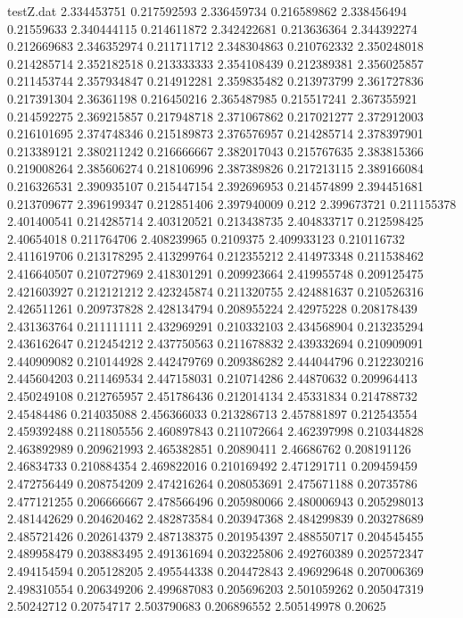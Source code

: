 \begin{filecontents*}{testZ.dat}
2.334453751  0.217592593
2.336459734  0.216589862
2.338456494  0.21559633
2.340444115  0.214611872
2.342422681  0.213636364
2.344392274  0.212669683
2.346352974  0.211711712
2.348304863  0.210762332
2.350248018  0.214285714
2.352182518  0.213333333
2.354108439  0.212389381
2.356025857  0.211453744
2.357934847  0.214912281
2.359835482  0.213973799
2.361727836  0.217391304
2.36361198  0.216450216
2.365487985  0.215517241
2.367355921  0.214592275
2.369215857  0.217948718
2.371067862  0.217021277
2.372912003  0.216101695
2.374748346  0.215189873
2.376576957  0.214285714
2.378397901  0.213389121
2.380211242  0.216666667
2.382017043  0.215767635
2.383815366  0.219008264
2.385606274  0.218106996
2.387389826  0.217213115
2.389166084  0.216326531
2.390935107  0.215447154
2.392696953  0.214574899
2.394451681  0.213709677
2.396199347  0.212851406
2.397940009  0.212
2.399673721  0.211155378
2.401400541  0.214285714
2.403120521  0.213438735
2.404833717  0.212598425
2.40654018  0.211764706
2.408239965  0.2109375
2.409933123  0.210116732
2.411619706  0.213178295
2.413299764  0.212355212
2.414973348  0.211538462
2.416640507  0.210727969
2.418301291  0.209923664
2.419955748  0.209125475
2.421603927  0.212121212
2.423245874  0.211320755
2.424881637  0.210526316
2.426511261  0.209737828
2.428134794  0.208955224
2.42975228  0.208178439
2.431363764  0.211111111
2.432969291  0.210332103
2.434568904  0.213235294
2.436162647  0.212454212
2.437750563  0.211678832
2.439332694  0.210909091
2.440909082  0.210144928
2.442479769  0.209386282
2.444044796  0.212230216
2.445604203  0.211469534
2.447158031  0.210714286
2.44870632  0.209964413
2.450249108  0.212765957
2.451786436  0.212014134
2.45331834  0.214788732
2.45484486  0.214035088
2.456366033  0.213286713
2.457881897  0.212543554
2.459392488  0.211805556
2.460897843  0.211072664
2.462397998  0.210344828
2.463892989  0.209621993
2.465382851  0.20890411
2.46686762  0.208191126
2.46834733  0.210884354
2.469822016  0.210169492
2.471291711  0.209459459
2.472756449  0.208754209
2.474216264  0.208053691
2.475671188  0.20735786
2.477121255  0.206666667
2.478566496  0.205980066
2.480006943  0.205298013
2.481442629  0.204620462
2.482873584  0.203947368
2.484299839  0.203278689
2.485721426  0.202614379
2.487138375  0.201954397
2.488550717  0.204545455
2.489958479  0.203883495
2.491361694  0.203225806
2.492760389  0.202572347
2.494154594  0.205128205
2.495544338  0.204472843
2.496929648  0.207006369
2.498310554  0.206349206
2.499687083  0.205696203
2.501059262  0.205047319
2.50242712  0.20754717
2.503790683  0.206896552
2.505149978  0.20625

\end{filecontents*}
